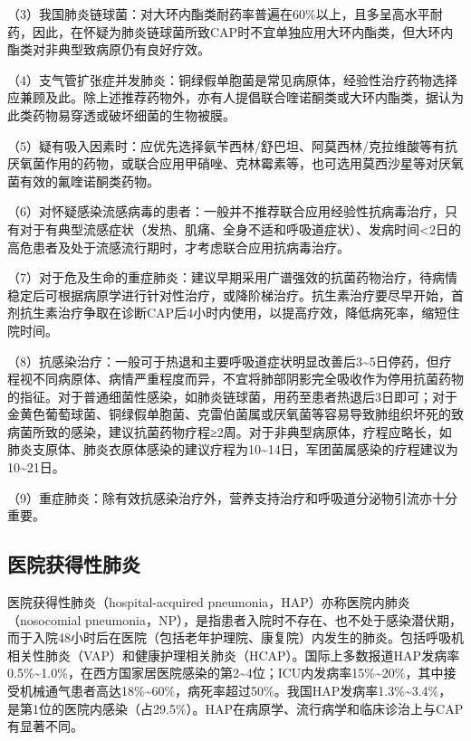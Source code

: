 （3）我国肺炎链球菌：对大环内酯类耐药率普遍在60\%以上，且多呈高水平耐药，因此，在怀疑为肺炎链球菌所致CAP时不宜单独应用大环内酯类，但大环内酯类对非典型致病原仍有良好疗效。

（4）支气管扩张症并发肺炎：铜绿假单胞菌是常见病原体，经验性治疗药物选择应兼顾及此。除上述推荐药物外，亦有人提倡联合喹诺酮类或大环内酯类，据认为此类药物易穿透或破坏细菌的生物被膜。

（5）疑有吸入因素时：应优先选择氨苄西林/舒巴坦、阿莫西林/克拉维酸等有抗厌氧菌作用的药物，或联合应用甲硝唑、克林霉素等，也可选用莫西沙星等对厌氧菌有效的氟喹诺酮类药物。

（6）对怀疑感染流感病毒的患者：一般并不推荐联合应用经验性抗病毒治疗，只有对于有典型流感症状（发热、肌痛、全身不适和呼吸道症状）、发病时间\textless{}2日的高危患者及处于流感流行期时，才考虑联合应用抗病毒治疗。

（7）对于危及生命的重症肺炎：建议早期采用广谱强效的抗菌药物治疗，待病情稳定后可根据病原学进行针对性治疗，或降阶梯治疗。抗生素治疗要尽早开始，首剂抗生素治疗争取在诊断CAP后4小时内使用，以提高疗效，降低病死率，缩短住院时间。

（8）抗感染治疗：一般可于热退和主要呼吸道症状明显改善后3\textasciitilde{}5日停药，但疗程视不同病原体、病情严重程度而异，不宜将肺部阴影完全吸收作为停用抗菌药物的指征。对于普通细菌性感染，如肺炎链球菌，用药至患者热退后3日即可；对于金黄色葡萄球菌、铜绿假单胞菌、克雷伯菌属或厌氧菌等容易导致肺组织坏死的致病菌所致的感染，建议抗菌药物疗程≥2周。对于非典型病原体，疗程应略长，如肺炎支原体、肺炎衣原体感染的建议疗程为10\textasciitilde{}14日，军团菌属感染的疗程建议为10\textasciitilde{}21日。

（9）重症肺炎：除有效抗感染治疗外，营养支持治疗和呼吸道分泌物引流亦十分重要。

\subsection{医院获得性肺炎}

医院获得性肺炎（hospital-acquired
pneumonia，HAP）亦称医院内肺炎（nosocomial
pneumonia，NP），是指患者入院时不存在、也不处于感染潜伏期，而于入院48小时后在医院（包括老年护理院、康复院）内发生的肺炎。包括呼吸机相关性肺炎（VAP）和健康护理相关肺炎（HCAP）。国际上多数报道HAP发病率0.5\%\textasciitilde{}1.0\%，在西方国家居医院感染的第2\textasciitilde{}4位；ICU内发病率15\%\textasciitilde{}20\%，其中接受机械通气患者高达18\%\textasciitilde{}60\%，病死率超过50\%。我国HAP发病率1.3\%\textasciitilde{}3.4\%，是第1位的医院内感染（占29.5\%）。HAP在病原学、流行病学和临床诊治上与CAP有显著不同。

